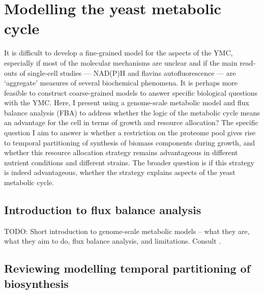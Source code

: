 \chapter{Modelling the yeast metabolic cycle}
\label{ch:model}

It is difficult to develop a fine-grained model for the aspects of the YMC,
especially if most of the molecular mechanisms are unclear
and if the main read-outs of single-cell studies --- NAD(P)H and flavins autofluorescence --- are `aggregate' measures of several biochemical phenomena.
It is perhaps more feasible to construct coarse-grained models to answer specific biological questions with the YMC.
Here, I present using a genome-scale metabolic model and flux balance analysis (FBA) to address whether the logic of the metabolic cycle means an advantage for the cell in terms of growth and resource allocation?
The specific question I aim to answer is whether a restriction on the proteome pool gives rise to temporal partitioning of synthesis of biomass components during growth, and whether this resource allocation strategy remains advantageous in different nutrient conditions and different strains.
The broader question is if this strategy is indeed advantageous, whether the strategy explains aspects of the yeast metabolic cycle.

\section{Introduction to flux balance analysis}
\label{sec:model-fba}

TODO: Short introduction to genome-scale metabolic models -- what they are, what they aim to do, flux balance analysis, and limitations.  Consult \textcite{orthWhatFluxBalance2010}.

\section{Reviewing modelling temporal partitioning of biosynthesis}
\label{sec:model-temporal}


